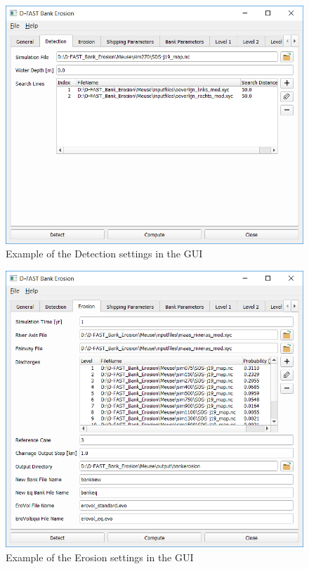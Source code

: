 \begin{figure}
\center
\includegraphics[width=\textwidth]{figures/gui2.png}
\caption{Example of the Detection settings in the GUI}
\label{guiDetect}
\end{figure}

\begin{figure}
\center
\includegraphics[width=\textwidth]{figures/gui3.png}
\caption{Example of the Erosion settings in the GUI}
\label{guiErode}
\end{figure}

